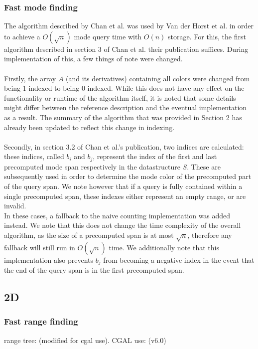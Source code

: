 \documentclass{article}
\begin{document}
\subsubsection{Fast mode finding}
The algorithm described by Chan et al. \cite{Chan2014} was used by Van der Horst et al. in order to achieve a $O(\sqrt{n})$ mode query time with $O(n)$ storage. For this, the first algorithm described in section 3 of Chan et al. their publication suffices. During implementation of this, a few things of note were changed.\\\\
Firstly, the array $A$ (and its derivatives) containing all colors were changed from being 1-indexed to being 0-indexed. While this does not have any effect on the functionality or runtime of the algorithm itself, it is noted that some details might differ between the reference description and the eventual implementation as a result. The summary of the algorithm that was provided in Section 2 has already been updated to reflect this change in indexing.\\\\
Secondly, in section 3.2 of Chan et al.'s publication, two indices are calculated: these indices, called $b_i$ and $b_j$, represent the index of the first and last precomputed mode span respectively in the datastructure $S$. These are subsequently used in order to determine the mode color of the precomputed part of the query span. We note however that if a query is fully contained within a single precomputed span, these indexes either represent an empty range, or are invalid. \\
In these cases, a fallback to the naive counting implementation was added instead. We note that this does not change the time complexity of the overall algorithm, as the size of a precomputed span is at most $\sqrt{n}$, therefore any fallback will still run in $O(\sqrt{n})$ time. We additionally note that this implementation also prevents $b_j$ from becoming a negative index in the event that the end of the query span is in the first precomputed span.
\subsection{2D}
\subsubsection{Fast range finding}
range tree: \cite{Lucaweihs} (modified for cgal use). CGAL use: (v6.0) \cite{cgal:numbertypes} \cite{cgal:dDkernel} \cite{cgal:foundations}
\end{document}

